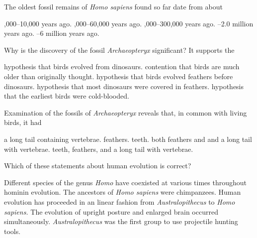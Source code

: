 \question
The oldest fossil remains of \textit{Homo sapiens} found so far date from about  

\begin{choices}
,000–10,000 years ago. %
,000–60,000 years ago. %
,000–300,000 years ago. %
–2.0 million years ago. %
–6 million years ago. %
\end{choices}

\question
Why is the discovery of the fossil \textit{Archaeopteryx} significant? It supports the  

\begin{choices}
\correctchoice hypothesis that birds evolved from dinosaurs. %
\choice contention that birds are much older than originally thought. %
\choice hypothesis that birds evolved feathers before dinosaurs. %
\choice hypothesis that most dinosaurs were covered in feathers. %
\choice hypothesis that the earliest birds were cold-blooded. %
\end{choices}


\question
Examination of the fossils of \textit{Archaeopteryx} reveals that, in common with living birds, it had  

\begin{choices}
\choice a long tail containing vertebrae. %
\choice feathers.  %
\choice teeth.  %
\choice both feathers and and a long tail with vertebrae.  %
\choice teeth, feathers, and a long tail with vertebrae. %
\end{choices}


\question
Which of these statements about human evolution is correct?  

\begin{choices}
\correctchoice Different species of the genus \textit{Homo} have coexisted at various times throughout hominin evolution.   %
\choice The ancestors of \textit{Homo sapiens} were chimpanzees.   %
\choice Human evolution has proceeded in an linear fashion from \textit{Australopithecus} to \textit{Homo sapiens.}   %
\choice The evolution of upright posture and enlarged brain occurred simultaneously.   %
\choice \textit{Australopithecus} was the first group to use projectile hunting tools. %
\end{choices}


